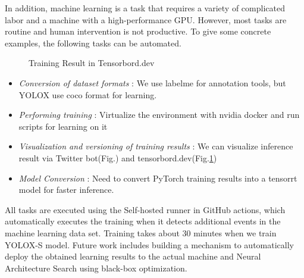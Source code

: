 \documentclass[lettersize,journal]{IEEEtran}
\begin{document}
In addition, machine learning is a task that requires a variety of complicated labor and a machine with a high-performance GPU.
However, most tasks are routine and human intervention is not productive.
To give some concrete examples, the following tasks can be automated.

\begin{figure}[H]
    \begin{center}
  \end{center}
  \caption{Training Result in Tensorbord.dev}
  \label{fig:tensorbord}
\end{figure}

\begin{itemize}
    \item {\it Conversion of dataset formats }:
        We use labelme for annotation tools, but YOLOX use coco format for learning.
    \item {\it Performing training }:
        Virtualize the environment with nvidia docker and run scripts for learning on it
    \item {\it Visualization and versioning of training results }:
        We can visualize inference result via Twitter bot(Fig.\cite{wam_v_tan_bot}) and tensorbord.dev(Fig.\ref{fig:tensorbord})
    \item {\it Model Conversion }:
        Need to convert PyTorch training results into a tensorrt model for faster inference.
\end{itemize}

All tasks are executed using the Self-hosted runner in GitHub actions, 
which automatically executes the training when it detects additional events in the machine learning data set.
Training takes about 30 minutes when we train YOLOX-S model.
Future work includes building a mechanism to automatically deploy the obtained learning results to 
the actual machine and Neural Architecture Search using black-box optimization.
\end{document}
